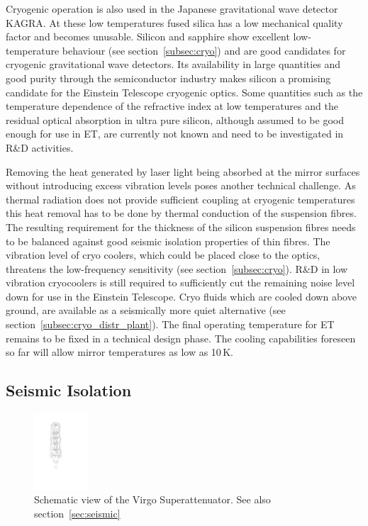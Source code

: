 Cryogenic operation is also used in the Japanese gravitational wave detector KAGRA. At these low temperatures fused silica has a low mechanical quality factor and becomes unusable. Silicon and sapphire show excellent low-temperature behaviour (see section~\ref{subsec:cryo}) and are good candidates for cryogenic gravitational wave detectors. Its availability in large 
quantities and good purity through the semiconductor industry makes silicon a 
promising candidate for the Einstein Telescope cryogenic optics. Some quantities 
such as the temperature dependence of the refractive index at low temperatures 
and the residual optical absorption in ultra pure silicon, although assumed to be 
good enough for use in ET, are currently not known and need to be 
investigated in R\&D activities.

Removing the heat generated by laser light being absorbed at the mirror surfaces 
without introducing excess vibration levels poses another technical challenge. As 
thermal radiation does not provide sufficient coupling at cryogenic temperatures 
this heat removal has to be done by thermal conduction of the suspension fibres. 
The resulting requirement for the thickness of the silicon suspension fibres needs 
to be balanced against good seismic isolation properties of thin fibres. The vibration 
level of cryo coolers, which could be placed close to the optics, threatens the 
low-frequency sensitivity (see section~\ref{subsec:cryo}). R\&D in low vibration cryocoolers is still required to sufficiently cut the remaining noise 
level down for use in the Einstein Telescope. Cryo fluids which are cooled down above ground, are available as a seismically more quiet alternative (see section~\ref{subsec:cryo_distr_plant}). 
The final operating temperature for ET remains to be fixed in a technical design phase. The cooling capabilities foreseen so far will allow mirror temperatures as low as 10\,K.

\subsection{Seismic Isolation}

\begin{figure}
\vskip -0.4cm
	\centering
		\includegraphics[width=0.18\textwidth]{./Intro/Intro_Figures/VirgoSA.pdf}
\vskip 0.3cm
	\caption{Schematic view of the Virgo Superattenuator. See also section~\ref{sec:seismic}}
\vskip -0.6cm
\label{SAfig1}
\end{figure} 

